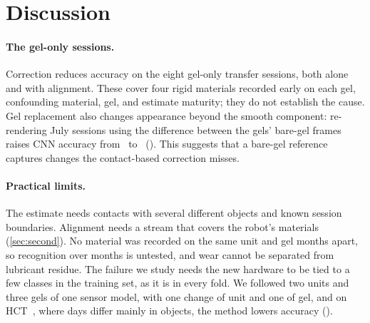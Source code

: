 \section{Discussion}
\label{sec:discussion}

\paragraph{The gel-only sessions.}
Correction reduces accuracy on the eight gel-only transfer sessions, both alone and with alignment. These cover four rigid materials recorded early on each gel, confounding material, gel, and estimate maturity; they do not establish the cause. Gel replacement also changes appearance beyond the smooth component: re-rendering July sessions using the difference between the gels' bare-gel frames raises CNN accuracy from \GelRrCSupRaw\ to \GelRrCSupRr\pct\ (). This suggests that a bare-gel reference captures changes the contact-based correction misses.

\paragraph{Practical limits.}
The estimate needs contacts with several different objects and known session boundaries. Alignment needs a stream that covers the robot's materials (\cref{sec:second}). No material was recorded on the same unit and gel months apart, so recognition over months is untested, and wear cannot be separated from lubricant residue. The failure we study needs the new hardware to be tied to a few classes in the training set, as it is in every fold. We followed two units and three gels of one sensor model, with one change of unit and one of gel, and on HCT~\cite{tvl2024}, where days differ mainly in objects, the method lowers accuracy ().
